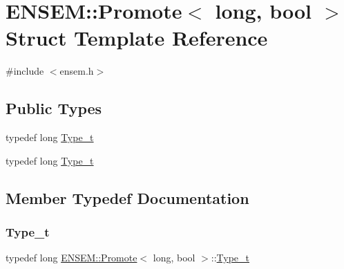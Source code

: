 \hypertarget{structENSEM_1_1Promote_3_01long_00_01bool_01_4}{}\section{E\+N\+S\+EM\+:\+:Promote$<$ long, bool $>$ Struct Template Reference}
\label{structENSEM_1_1Promote_3_01long_00_01bool_01_4}


{\ttfamily \#include $<$ensem.\+h$>$}

\subsection*{Public Types}
\begin{DoxyCompactItemize}
\item 
typedef long \mbox{\hyperlink{structENSEM_1_1Promote_3_01long_00_01bool_01_4_aa60bf905b8b32da5f453ddcc2d32f24e}{Type\+\_\+t}}
\item 
typedef long \mbox{\hyperlink{structENSEM_1_1Promote_3_01long_00_01bool_01_4_aa60bf905b8b32da5f453ddcc2d32f24e}{Type\+\_\+t}}
\end{DoxyCompactItemize}


\subsection{Member Typedef Documentation}
\mbox{\label{structENSEM_1_1Promote_3_01long_00_01bool_01_4_aa60bf905b8b32da5f453ddcc2d32f24e}} 
\subsubsection{\texorpdfstring{Type\_t}{Type\_t}\hspace{0.1cm}{\footnotesize\ttfamily [1/2]}}
{\footnotesize\ttfamily typedef long \mbox{\hyperlink{structENSEM_1_1Promote}{E\+N\+S\+E\+M\+::\+Promote}}$<$ long, bool $>$\+::\mbox{\hyperlink{structENSEM_1_1Promote_3_01long_00_01bool_01_4_aa60bf905b8b32da5f453ddcc2d32f24e}{Type\+\_\+t}}}

\mbox{\label{structENSEM_1_1Promote_3_01long_00_01bool_01_4_aa60bf905b8b32da5f453ddcc2d32f24e}} 
